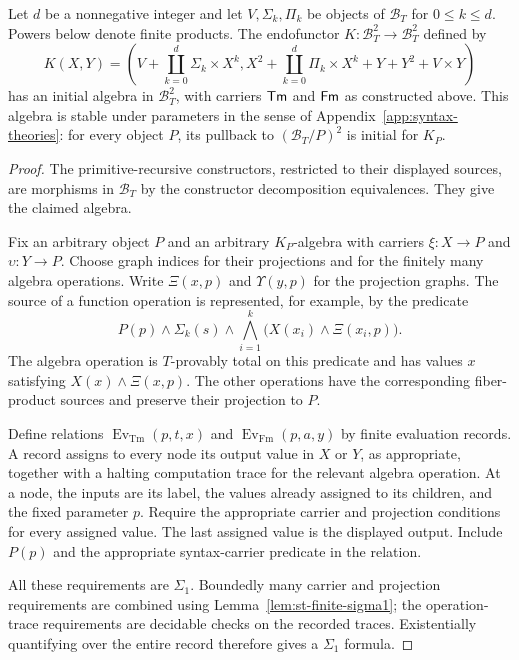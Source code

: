\begin{proposition}
\label{prop:st-syntax-initiality}
Let $d$ be a nonnegative integer and let $V,\Sigma_k,\Pi_k$ be
objects of $\mathcal B_T$ for $0\leq k\leq d$. Powers below
denote finite products. The endofunctor
$K:\mathcal B_T^2\to\mathcal B_T^2$ defined by
\[
 K(X,Y)=\left(
 V+\coprod_{k=0}^{d}\Sigma_k\times X^k,
 X^2+\coprod_{k=0}^{d}\Pi_k\times X^k+Y+Y^2+V\times Y
 \right)
\]
has an initial algebra in $\mathcal B_T^2$, with carriers
$\mathsf{Tm}$ and $\mathsf{Fm}$ as constructed above. This algebra is stable
under parameters in the sense of Appendix~\ref{app:syntax-theories}: for every object $P$,
its pullback to $(\mathcal B_T/P)^2$ is initial for $K_P$.
\end{proposition}
\begin{proof}
The primitive-recursive constructors, restricted to their displayed
sources, are morphisms in $\mathcal B_T$ by the constructor
decomposition equivalences. They give the claimed algebra.

Fix an arbitrary object $P$ and an arbitrary $K_P$-algebra with
carriers $\xi:X\to P$ and $\upsilon:Y\to P$. Choose graph indices for their projections and for the
finitely many algebra operations. Write
$\Xi(x,p)$ and $\Upsilon(y,p)$ for the projection graphs. The source of a function operation is represented, for example, by
the predicate
\[
       P(p)\land\Sigma_k(s)\land
       \bigwedge_{i=1}^k\bigl(X(x_i)\land\Xi(x_i,p)\bigr).
\]
The algebra operation
is $T$-provably total on this predicate and has values $x$ satisfying
$X(x)\land\Xi(x,p)$. The other operations have the corresponding
fiber-product sources and preserve their projection to $P$.

Define relations $\operatorname{Ev}_{\mathrm{Tm}}(p,t,x)$ and
$\operatorname{Ev}_{\mathrm{Fm}}(p,a,y)$ by finite evaluation
records. A record assigns to every node its output value
in $X$ or $Y$, as appropriate, together with a halting computation
trace for the relevant algebra operation. At a node, the inputs
are its label, the values already assigned to its children, and
the fixed parameter $p$. Require the appropriate carrier and
projection conditions for every assigned value. The last assigned
value is the displayed output. Include $P(p)$ and the appropriate
syntax-carrier predicate in the relation.

All these requirements are $\Sigma_1$. Boundedly many carrier and
projection requirements are combined using
Lemma~\ref{lem:st-finite-sigma1}; the operation-trace requirements
are decidable checks on the recorded traces. Existentially
quantifying over the entire record therefore gives a
$\Sigma_1$ formula.


\end{proof}
